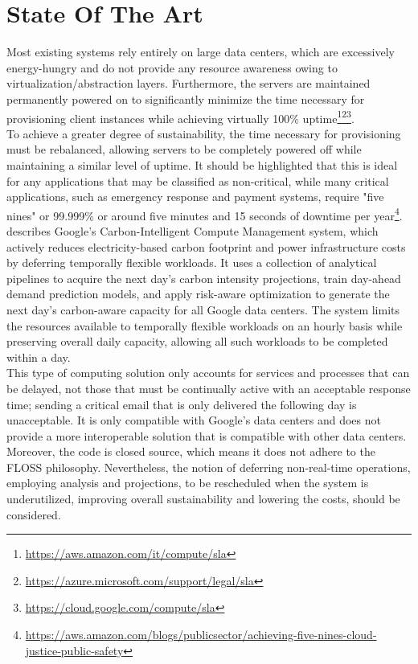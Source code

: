 \section{State Of The Art}
\label{sec:introduction_state_of_the_art}

Most existing systems rely entirely on large data centers, which are excessively
energy-hungry and do not provide any resource awareness owing to virtualization/abstraction
layers. Furthermore, the servers are maintained permanently powered on to
significantly minimize the time necessary for provisioning client instances
while achieving virtually 100\% uptime\footnote{\url{https://aws.amazon.com/it/compute/sla}}\footnote{\url{https://azure.microsoft.com/support/legal/sla}}\footnote{\url{https://cloud.google.com/compute/sla}}.
\\ %
To achieve a greater degree of sustainability, the time necessary for
provisioning must be rebalanced, allowing servers to be completely powered off while
maintaining a similar level of uptime. It should be highlighted that this is
ideal for any applications that may be classified as non-critical, while many critical
applications, such as emergency response and payment systems, require "five
nines" or 99.999\% or around five minutes and 15 seconds of downtime per year\footnote{\url{https://aws.amazon.com/blogs/publicsector/achieving-five-nines-cloud-justice-public-safety}}.
\\ %

\cite{carbon_aware_computing_datacenters} describes Google's Carbon-Intelligent Compute
Management system, which actively reduces electricity-based carbon footprint and
power infrastructure costs by deferring temporally flexible workloads. It uses a
collection of analytical pipelines to acquire the next day's carbon intensity projections,
train day-ahead demand prediction models, and apply risk-aware optimization to generate
the next day's carbon-aware capacity for all Google data centers. The system
limits the resources available to temporally flexible workloads on an hourly
basis while preserving overall daily capacity, allowing all such workloads to be
completed within a day. \\ %
This type of computing solution only accounts for services and processes that can
be delayed, not those that must be continually active with an acceptable
response time; sending a critical email that is only delivered the following day
is unacceptable. It is only compatible with Google's data centers and does not
provide a more interoperable solution that is compatible with other data centers.
Moreover, the code is closed source, which means it does not adhere to the FLOSS
philosophy. Nevertheless, the notion of deferring non-real-time operations,
employing analysis and projections, to be rescheduled when the system is underutilized,
improving overall sustainability and lowering the costs, should be considered.
\\ %

